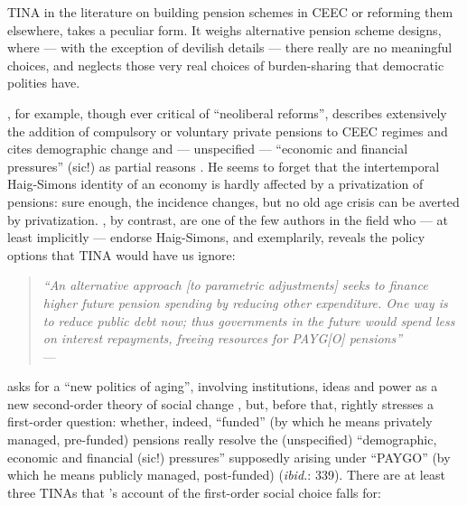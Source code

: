 \documentclass[11pt,a4paper,oneside,openright]{article}
\begin{document}
TINA in the literature on building pension schemes in \gls{CEEC} or reforming them elsewhere, takes a peculiar form. 
It weighs alternative pension scheme designs, where --- with the exception of devilish details --- there really are no meaningful choices, and neglects those very real choices of burden-sharing that democratic polities have. 

\citeauthor{Cerami2009a}, for example, though ever critical of ``neoliberal reforms'', describes extensively the addition of compulsory or voluntary private pensions to \gls{CEEC} regimes and cites demographic change and --- unspecified --- ``economic and financial pressures'' (sic!) as partial reasons \citeyearpar[336]{Cerami2009a}. 
He seems to forget that the intertemporal Haig-Simons identity of an economy is hardly affected by a privatization of pensions: 
sure enough, the incidence changes, but no old age crisis can be averted by privatization. 
\cite{Barr2005a}, by contrast, are one of the few authors in the field who --- at least implicitly --- endorse Haig-Simons, and exemplarily, reveals the policy options that TINA would have us ignore: 
\begin{quote}
	\emph{``An alternative approach [to parametric adjustments] seeks to finance higher future pension spending by reducing other expenditure. 
	One way is to reduce public debt now; thus governments in the future would spend less on interest repayments, freeing resources for PAYG[O] pensions''}\\
	--- \cite[152]{Barr2005a}
\end{quote}

\citeauthor{Cerami2009a} asks for a ``new politics of aging'', involving institutions, ideas and power as a new second-order theory of social change \citeyearpar[338]{Cerami2009a}, but, before that, rightly stresses a first-order question: 
whether, indeed, ``funded'' (by which he means privately managed, pre-funded) pensions really resolve the (unspecified) ``demographic, economic and financial (sic!) pressures'' supposedly arising under ``PAYGO'' (by which he means publicly managed, post-funded) (\emph{ibid.}: 339). 
There are at least three TINAs that \citeauthor{Cerami2009a}'s account of the first-order social choice falls for:
\end{document}
